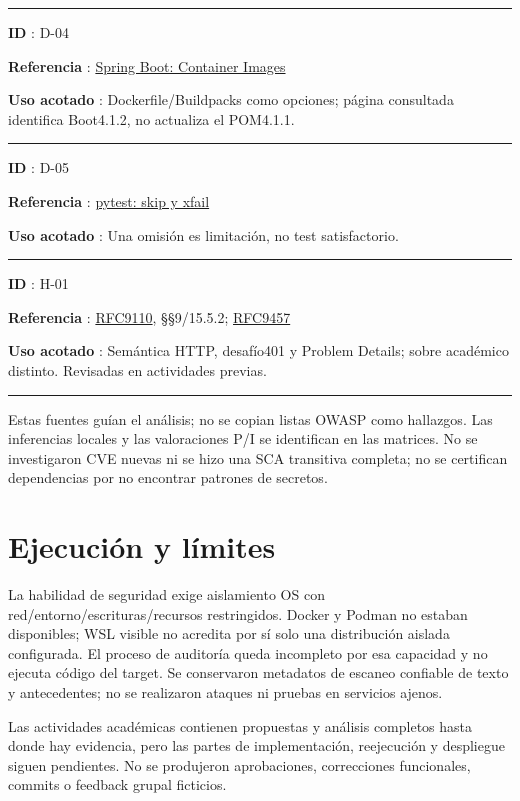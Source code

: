 \documentclass[12pt,a4paper]{report}
\begin{document}
\medskip\hrule\medskip

\textbf{ID }: D-04

\textbf{Referencia
}: \href{https://docs.spring.io/spring-boot/reference/packaging/container-images/index.html}{Spring
Boot: Container Images}

\textbf{Uso acotado }: Dockerfile/Buildpacks como opciones; página
consultada identifica Boot4.1.2, no actualiza el POM4.1.1.

\medskip\hrule\medskip

\textbf{ID }: D-05

\textbf{Referencia
}: \href{https://docs.pytest.org/en/stable/how-to/skipping.html}{pytest:
skip y xfail}

\textbf{Uso acotado }: Una omisión es limitación, no test satisfactorio.

\medskip\hrule\medskip

\textbf{ID }: H-01

\textbf{Referencia
}: \href{https://www.rfc-editor.org/rfc/rfc9110.html}{RFC9110},
§§9/15.5.2; \href{https://www.rfc-editor.org/rfc/rfc9457.html}{RFC9457}

\textbf{Uso acotado }: Semántica HTTP, desafío401 y Problem Details;
sobre académico distinto. Revisadas en actividades previas.

\medskip\hrule\medskip

Estas fuentes guían el análisis; no se copian listas OWASP como
hallazgos. Las inferencias locales y las valoraciones P/I se identifican
en las matrices. No se investigaron CVE nuevas ni se hizo una SCA
transitiva completa; no se certifican dependencias por no encontrar
patrones de secretos.

\section{Ejecución y
límites}\label{ACD5-semana-5-anexo2-ejecuciuxf3n-y-luxedmites}

La habilidad de seguridad exige aislamiento OS con
red/entorno/escrituras/recursos restringidos. Docker y Podman no estaban
disponibles; WSL visible no acredita por sí solo una distribución
aislada configurada. El proceso de auditoría queda incompleto por esa
capacidad y no ejecuta código del target. Se conservaron metadatos de
escaneo confiable de texto y antecedentes; no se realizaron ataques ni
pruebas en servicios ajenos.

Las actividades académicas contienen propuestas y análisis completos
hasta donde hay evidencia, pero las partes de implementación,
reejecución y despliegue siguen pendientes. No se produjeron
aprobaciones, correcciones funcionales, commits o feedback grupal
ficticios.
\end{document}
